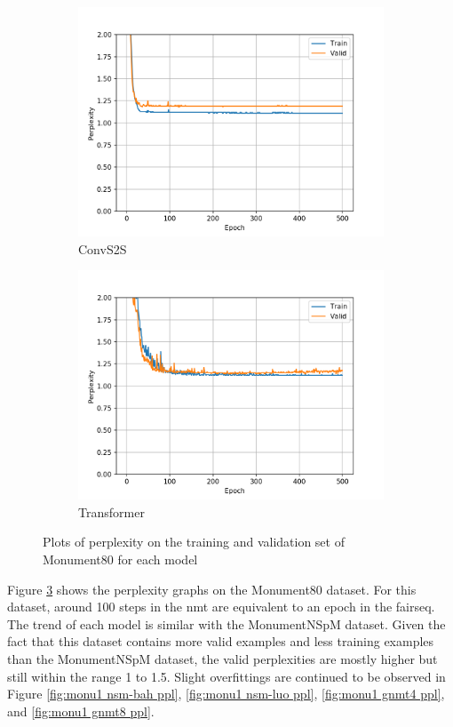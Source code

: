 \begin{figure}[h]
\begin{subfigure}{0.3\textwidth}
\includegraphics[width=\textwidth]{../results/monument2_1/run2/fconv_wmt_en_de/ppls.png} 
\caption{ConvS2S}
\label{fig:monu1 convs2s ppl}
\end{subfigure}
\hfill
\begin{subfigure}{0.3\textwidth}
\includegraphics[width=\textwidth]{../results/monument2_1/run1/transformer_iwslt_de_en/ppls.png}
\caption{Transformer}
\label{fig:monu1 transformer ppl}
\end{subfigure}
\hfill
\caption{Plots of perplexity on the training and validation set of Monument80 for each model}
\label{fig:monu1 ppls}
\end{figure}

Figure \ref{fig:monu1 ppls} shows the perplexity graphs on the Monument80 dataset. For this dataset, around 100 steps in the nmt are equivalent to an epoch in the fairseq. The trend of each model is similar with the MonumentNSpM dataset. Given the fact that this dataset contains more valid examples and less training examples than the MonumentNSpM dataset, the valid perplexities are mostly higher but still within the range 1 to 1.5. Slight overfittings are continued to be observed in Figure \ref{fig:monu1 nsm-bah ppl}, \ref{fig:monu1 nsm-luo ppl}, \ref{fig:monu1 gnmt4 ppl}, and \ref{fig:monu1 gnmt8 ppl}.

